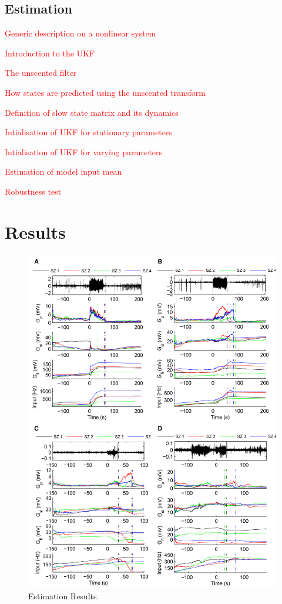 \documentclass{article}%
\newcommand\red{\textcolor{red}}
\begin{document}
\subsection{Estimation}

\red{Generic description on a nonlinear system}

\red{Introduction to the UKF}

\red{The unscented filter}

\red{How states are predicted using the unscented transform}

\red{Definition of slow state matrix and its dynamics}

\red{Intialisation of UKF for stationary parameters}


\red{Intialisation of UKF for varying parameters}

\red{Estimation of model input mean}

\red{Robustness test}

\section{Results}

\begin{figure}
 	\centering
 		\includegraphics{fig/ParameterEstimates.pdf}
 	\caption{Estimation Results.}
 	\label{fig: EstimationResults}
 \end{figure}
\end{document}
